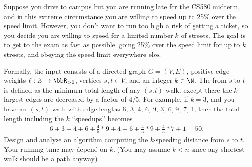 \documentclass{article}
\begin{document}
\setcounter{exercise}{2}
\begin{exercise}
  Suppose you drive to campus but you are running late for the CS580 midterm, and in this extreme circumstance you are willing to speed up to 25\% over the speed limit.
  However, you don't want to run too high a risk of getting a ticket, so you decide you are willing to speed for a limited number \( k \) of streets.
  The goal is to get to the exam as fast as possible, going 25\% over the speed limit for up to \( k \) streets, and obeying the speed limit everywhere else.

  Formally, the input consists of a directed graph \( G = (V, E) \), positive edge weights \( \ell:E\to \bbR_{>0} \), vertices \( s,t\in V \), and an integer \( k \in \N \).
  The  from \( s \) to \( t \) is defined as the minimum total length of any \( (s, t) \)-walk, except there the \( k \) largest edges are decreased by a factor of 4/5.
  For example, if \( k = 3 \), and you have an \( (s, t) \)-walk with edge lengths 6, 3, 4, 6, 9, 3, 6, 9, 7, 1, then the total length including the \( k \) ``speedups'' becomes \begin{align*}
    6+3+4+6+\frac{4}{5}*9+4+6+\frac{4}{5}*9+\frac{4}{5}*7+1=50.
  \end{align*}
  Design and analyze an algorithm computing the \( k \)-speeding distance from \( s \) to \( t \).
  Your running time may depend on \( k \). (You may assume \( k < n \) since any shortest walk should be a path anyway).
\end{exercise}
\end{document}
